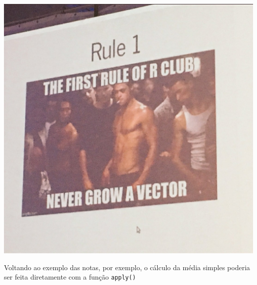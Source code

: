 \documentclass[10pt,a4paper]{book}
\begin{document}
\begin{center}\includegraphics[width=0.9\linewidth]{img/R_club} \end{center}

Voltando ao exemplo das notas, por exemplo, o cálculo da média simples
poderia ser feita diretamente com a função \texttt{apply()}
\end{document}
